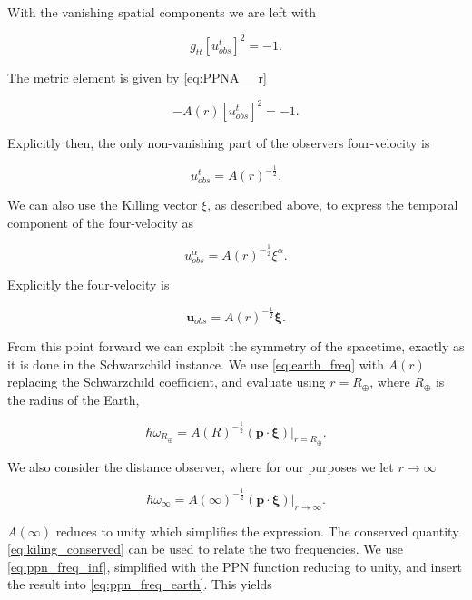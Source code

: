 \documentclass[11pt]{article}
\begin{document}
With the vanishing spatial components we are left with

\begin{equation}
    g_{tt} [u_{obs}^t]^2 = -1.
\end{equation}

The metric element is given by \eqref{eq:PPNA__r}

\begin{equation}
    -A(r) [u_{obs}^t]^2 = -1.
\end{equation}

Explicitly then, the only non-vanishing part of the observers four-velocity is

\begin{equation}
    u_{obs}^t = A(r)^{-\frac{1}{2}}.
\end{equation}

We can also use the Killing vector $\xi$, as described above, to express the temporal component of the four-velocity as

\begin{equation}
    u_{obs}^\alpha = A(r)^{-\frac{1}{2}} \xi ^\alpha.
\end{equation}

Explicitly the four-velocity is

\begin{equation}
    \boldsymbol{u}_{obs} = A(r)^{-\frac{1}{2}} \boldsymbol{\xi}.
\end{equation}

From this point forward we can exploit the symmetry of the spacetime, exactly as it is done in the Schwarzchild instance. We use \eqref{eq:earth_freq} with $A(r)$ replacing the Schwarzchild coefficient, and evaluate using $r=R_{\oplus}$, where $R_{\oplus}$ is the radius of the Earth,

\begin{equation}
    \label{eq:ppn_freq_earth}
    \hbar \omega_{R_{\oplus}} = A(R)^{-\frac{1}{2}} \left(\boldsymbol{p} \cdot \boldsymbol{\xi}\right)|_{r=R_{\oplus}}.
\end{equation}

We also consider the distance observer, where for our purposes we let $r \rightarrow \infty$

\begin{equation}
    \label{eq:ppn_freq_inf}
    \hbar \omega_{\infty} = A(\infty)^{-\frac{1}{2}} \left(\boldsymbol{p} \cdot \boldsymbol{\xi}\right)|_{r \rightarrow \infty}.
\end{equation}

$A(\infty)$ reduces to unity which simplifies the expression. The conserved quantity \eqref{eq:kiling_conserved} can be used to relate the two frequencies. We use \eqref{eq:ppn_freq_inf}, simplified with the PPN function reducing to unity, and insert the result into \eqref{eq:ppn_freq_earth}. This yields
\end{document}
